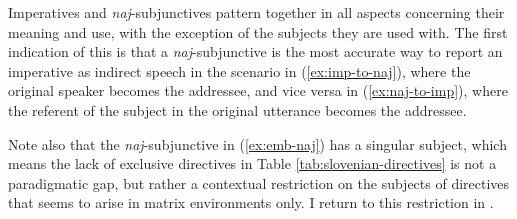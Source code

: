 \documentclass[output=paper,colorlinks,citecolor=brown]{langscibook}
\begin{document}
Imperatives and \emph{naj}-subjunctives pattern together in all aspects concerning their meaning and use, with the exception of the subjects they are used with. The first indication of this is that a \emph{naj}-subjunctive is the most accurate way to report an imperative as indirect speech in the scenario in (\ref{ex:imp-to-naj}), where the original speaker becomes the addressee, and vice versa in (\ref{ex:naj-to-imp}), where the referent of the \trd{} subject in the original utterance becomes the addressee. 

\ea {}\label{ex:imp-to-naj} 
\z\z

\ea \label{ex:naj-to-imp} 
\z\z

\noindent Note also that the \emph{naj}-subjunctive in (\ref{ex:emb-naj}) has a \fst{} singular subject, which means the lack of exclusive \fst{} directives in Table \ref{tab:slovenian-directives} is not a paradigmatic gap, but rather a contextual restriction on the subjects of directives that seems to arise in matrix environments only. I return to this restriction in . 
\end{document}
